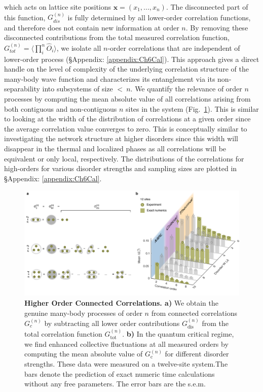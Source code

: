 which acts on lattice site positions $\textbf{x} = ( x_1, ..., x_n)$. The disconnected part of this function, $G^{(n)}_{dis}$ is fully determined by all lower-order correlation functions, and therefore does not contain new information at order $n$. By removing these disconnected contributions from the total measured correlation function, $G^{(n)}_{tot} = \langle \prod_i^n \hat{O}_i \rangle$, we isolate all $n$-order correlations that are independent of lower-order process (\S Appendix: \ref{appendix:Ch6Cal}). This approach gives a direct handle on the level of complexity of the underlying correlation structure of the many-body wave function and characterizes its entanglement via its non-separability into subsystems of size $<~n$. We quantify the relevance of order $n$ processes by computing the mean absolute value of all correlations arising from both contiguous and non-contiguous $n$ sites in the system (Fig.~\ref{fig:highOrder}). This is similar to looking at the width of the distribution of correlations at a given order since the average correlation value converges to zero. This is conceptually similar to investigating the network structure  at higher disorders since this width will disappear in the thermal and localized phases as all correlations will be equivalent or only local, respectively. The distributions of the correlations for high-orders for various disorder strengths and sampling sizes are plotted in \S Appendix: \ref{appendix:Ch6Cal}. 

\begin{figure}[t!]
		\includegraphics[width=\columnwidth]{figures/ch6/fig2b.pdf} 
		\caption{\textbf{Higher Order Connected Correlations. a)}  We obtain the genuine many-body processes of order $n$ from connected correlations $G_c^{(n)}$ by subtracting all lower order contributions $G_\text{dis}^{(n)}$ from the total correlation function $G_\text{tot}^{(n)}$. \textbf{b)} In the quantum critical regime, we find enhanced collective fluctuations at all measured orders by computing the mean absolute value of $G_\text{c}^{(n)}$ for different disorder strengths. These data were measured on a twelve-site system.The bars denote the prediction of exact numeric time calculations without any free parameters. The error bars are the s.e.m.}
		\label{fig:highOrder}	
\end{figure}

